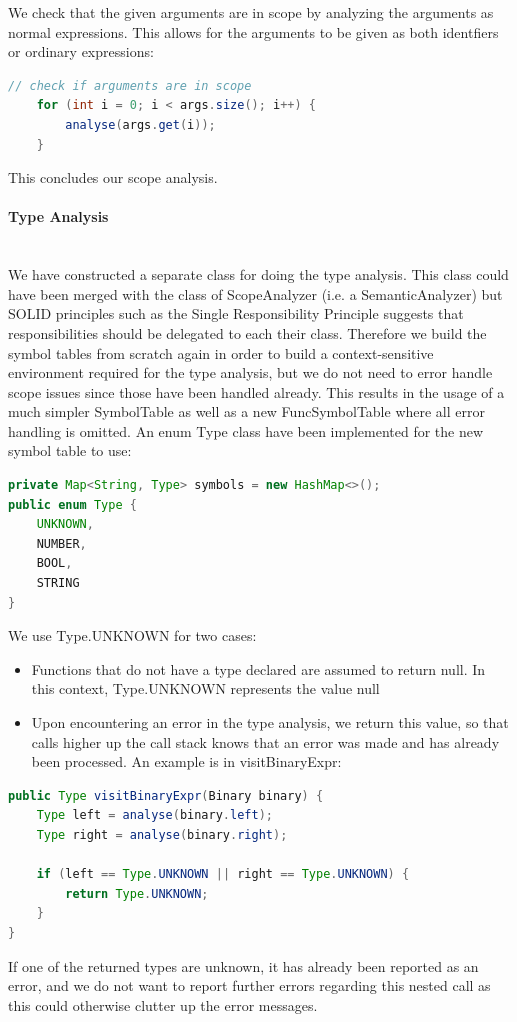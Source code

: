 We check that the given arguments are in scope by analyzing the arguments as normal expressions. This allows for the arguments to be given as both identfiers or ordinary expressions:
\begin{lstlisting}[language=java]
    // check if arguments are in scope
    for (int i = 0; i < args.size(); i++) {
        analyse(args.get(i));   
    }
\end{lstlisting}
This concludes our scope analysis.

\paragraph{Type Analysis}\mbox{}\\
We have constructed a separate class for doing the type analysis. This class could have been merged with the class of ScopeAnalyzer (i.e. a SemanticAnalyzer) but SOLID principles such as the Single Responsibility Principle suggests that responsibilities should be delegated to each their class.
Therefore we build the symbol tables from scratch again in order to build a context-sensitive environment required for the type analysis, but we do not need to error handle scope issues since those have been handled already.
This results in the usage of a much simpler SymbolTable as well as a new FuncSymbolTable where all error handling is omitted.
An enum Type class have been implemented for the new symbol table to use: 
\begin{lstlisting}[language=java]
private Map<String, Type> symbols = new HashMap<>();
public enum Type {
    UNKNOWN,
    NUMBER,
    BOOL,
    STRING
}
\end{lstlisting}
We use Type.UNKNOWN for two cases:
\begin{itemize}
    \item Functions that do not have a type declared are assumed to return null. In this context, Type.UNKNOWN represents the value null
    \item Upon encountering an error in the type analysis, we return this value, so that calls higher up the call stack knows that an error was made and has already been processed. An example is in visitBinaryExpr:
\end{itemize}
\begin{lstlisting}[language=java]
public Type visitBinaryExpr(Binary binary) {
    Type left = analyse(binary.left);
    Type right = analyse(binary.right);

    if (left == Type.UNKNOWN || right == Type.UNKNOWN) {
        return Type.UNKNOWN;
    }
}
\end{lstlisting}
If one of the returned types are unknown, it has already been reported as an error, and we do not want to report further errors regarding this nested call as this could otherwise clutter up the error messages.

